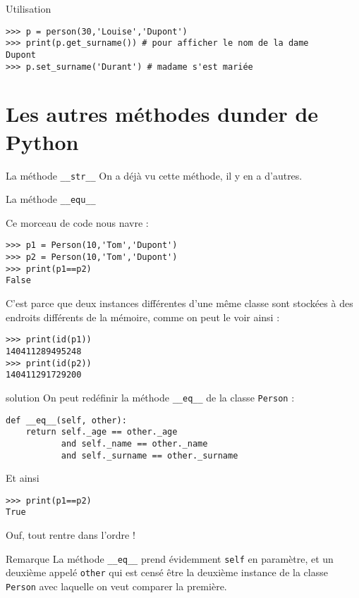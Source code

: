 \documentclass[10pt]{nsibeamer}
\begin{document}
\begin{frame}[fragile]{Utilisation}

\begin{verbatim}
>>> p = person(30,'Louise','Dupont')
>>> print(p.get_surname()) # pour afficher le nom de la dame
Dupont
>>> p.set_surname('Durant') # madame s'est mariée
\end{verbatim}
\end{frame}
\section{Les autres méthodes dunder de Python}
\begin{frame}{La méthode \texttt{\_\_str\_\_}}
	On a déjà vu cette méthode, il y en a d'autres.
\end{frame}
\begin{frame}[fragile]{La méthode \texttt{\_\_equ\_\_}}
	
Ce morceau de code nous navre :
	
\begin{verbatim}
>>> p1 = Person(10,'Tom','Dupont')
>>> p2 = Person(10,'Tom','Dupont')
>>> print(p1==p2)
False
\end{verbatim}
C'est parce que deux instances différentes d'une même classe sont stockées à des endroits différents de la mémoire, comme on peut le voir ainsi :
\begin{verbatim}
>>> print(id(p1))
140411289495248
>>> print(id(p2))
140411291729200
\end{verbatim}
\end{frame}
\begin{frame}[fragile]{solution}
On peut redéfinir la méthode \texttt{__eq__} de la classe \texttt{Person} :
\begin{verbatim}
def __eq__(self, other):
    return self._age == other._age 
           and self._name == other._name 
           and self._surname == other._surname
\end{verbatim}
Et ainsi
\begin{verbatim}
>>> print(p1==p2)
True
\end{verbatim}
Ouf, tout rentre dans l'ordre !
\end{frame}
\begin{frame}[fragile]{Remarque}
	La méthode \texttt{__eq__} prend évidemment \texttt{self} en paramètre, et un deuxième appelé \texttt{other} qui est censé être la deuxième instance de la classe \texttt{Person} avec laquelle on veut comparer la première.

\end{frame}
\end{document}
